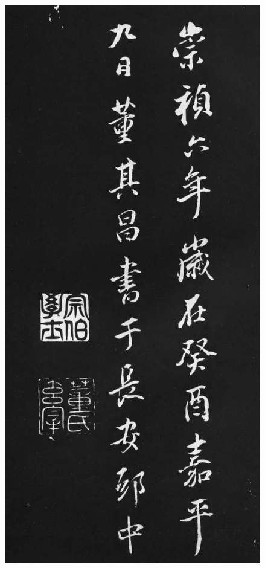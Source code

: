 \documentclass[a4paper,twoside]{article}
\begin{document}
\begin{figure}[ht]
\centering
\includegraphics[width=11.2cm]{images/dongqichang-9}
\end{figure}
\cleardoublepage
\end{document}
